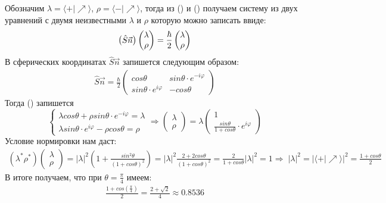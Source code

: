 \documentclass[__main__.tex]{subfiles}
\begin{document}
Обозначим $\lambda = \langle+|\nearrow\rangle$, $\rho = \langle-|\nearrow\rangle$, тогда из () и () получаем систему из двух уравнений с двумя неизвестными $\lambda$ и $\rho$ которую можно записать ввиде:
\begin{gather}
    \llabel{ch-16-4}
    \begin{pmatrix} \hat{S}\vec{n} \end{pmatrix}\begin{pmatrix} \lambda \\ \rho \end{pmatrix} = \frac{\hbar}{2} \begin{pmatrix} \lambda \\ \rho\end{pmatrix}
\end{gather}
В сферических координатах $\hat{S}\vec{n}$ запишется следующим образом:
\begin{gather*}
    \hat{S}\vec{n} = \frac{\hbar}{2}\begin{pmatrix} cos\theta & sin\theta\cdot e^{-i\varphi} \\ sin\theta\cdot e^{i\varphi} & -cos\theta \end{pmatrix}
\end{gather*}
Тогда () запишется
\begin{equation*}
    \begin{cases}
        \lambda cos\theta + \rho sin\theta\cdot e^{-i\varphi} = \lambda \\
        \lambda sin\theta\cdot e^{i\varphi} - \rho cos\theta = \rho
    \end{cases}
    \Rightarrow
    \begin{pmatrix} \lambda \\ \rho \end{pmatrix} = \lambda \begin{pmatrix} 1 \\ \frac{sin\theta}{1+cos\theta}\cdot e^{i\varphi}\end{pmatrix}
\end{equation*}
Условие нормировки нам даст:
\begin{gather*}
    \left(\lambda^{*}\rho^{*}\right)\begin{pmatrix}\lambda \\ \rho \end{pmatrix} = |\lambda|^2\left(1+\frac{sin^2\theta}{(1+cos\theta)^2}\right) = |\lambda|^2\frac{2+2cos\theta}{(1+cos\theta)^2} = \frac{2}{1+cos\theta}|\lambda|^2 = 1  \Rightarrow \; |\lambda|^2 = \left|\langle+|\nearrow\rangle\right|^2 = \frac{1+cos\theta}{2}
\end{gather*}
В итоге получаем, что при $\theta = \frac\pi4$ имеем:
\begin{gather*}
    \frac{1+cos\left(\frac{\pi}{4}\right)}{2} = \frac{2+\sqrt{2}}{4} \approx 0.8536
\end{gather*}
\end{document}
